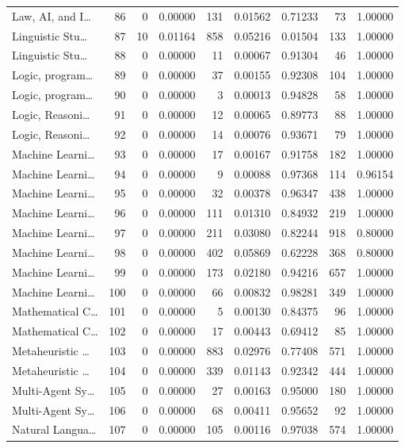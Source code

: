 \begin{table}
\begin{tabular}{lrrrrrrrr}
Law, AI, and I… & 86 & 0 & 0.00000 & 131 & 0.01562 & 0.71233 & 73 & 1.00000 \\
Linguistic Stu… & 87 & 10 & 0.01164 & 858 & 0.05216 & 0.01504 & 133 & 1.00000 \\
Linguistic Stu… & 88 & 0 & 0.00000 & 11 & 0.00067 & 0.91304 & 46 & 1.00000 \\
Logic, program… & 89 & 0 & 0.00000 & 37 & 0.00155 & 0.92308 & 104 & 1.00000 \\
Logic, program… & 90 & 0 & 0.00000 & 3 & 0.00013 & 0.94828 & 58 & 1.00000 \\
Logic, Reasoni… & 91 & 0 & 0.00000 & 12 & 0.00065 & 0.89773 & 88 & 1.00000 \\
Logic, Reasoni… & 92 & 0 & 0.00000 & 14 & 0.00076 & 0.93671 & 79 & 1.00000 \\
Machine Learni… & 93 & 0 & 0.00000 & 17 & 0.00167 & 0.91758 & 182 & 1.00000 \\
Machine Learni… & 94 & 0 & 0.00000 & 9 & 0.00088 & 0.97368 & 114 & 0.96154 \\
Machine Learni… & 95 & 0 & 0.00000 & 32 & 0.00378 & 0.96347 & 438 & 1.00000 \\
Machine Learni… & 96 & 0 & 0.00000 & 111 & 0.01310 & 0.84932 & 219 & 1.00000 \\
Machine Learni… & 97 & 0 & 0.00000 & 211 & 0.03080 & 0.82244 & 918 & 0.80000 \\
Machine Learni… & 98 & 0 & 0.00000 & 402 & 0.05869 & 0.62228 & 368 & 0.80000 \\
Machine Learni… & 99 & 0 & 0.00000 & 173 & 0.02180 & 0.94216 & 657 & 1.00000 \\
Machine Learni… & 100 & 0 & 0.00000 & 66 & 0.00832 & 0.98281 & 349 & 1.00000 \\
Mathematical C… & 101 & 0 & 0.00000 & 5 & 0.00130 & 0.84375 & 96 & 1.00000 \\
Mathematical C… & 102 & 0 & 0.00000 & 17 & 0.00443 & 0.69412 & 85 & 1.00000 \\
Metaheuristic … & 103 & 0 & 0.00000 & 883 & 0.02976 & 0.77408 & 571 & 1.00000 \\
Metaheuristic … & 104 & 0 & 0.00000 & 339 & 0.01143 & 0.92342 & 444 & 1.00000 \\
Multi-Agent Sy… & 105 & 0 & 0.00000 & 27 & 0.00163 & 0.95000 & 180 & 1.00000 \\
Multi-Agent Sy… & 106 & 0 & 0.00000 & 68 & 0.00411 & 0.95652 & 92 & 1.00000 \\
Natural Langua… & 107 & 0 & 0.00000 & 105 & 0.00116 & 0.97038 & 574 & 1.00000 \\

\end{tabular}
\end{table}
